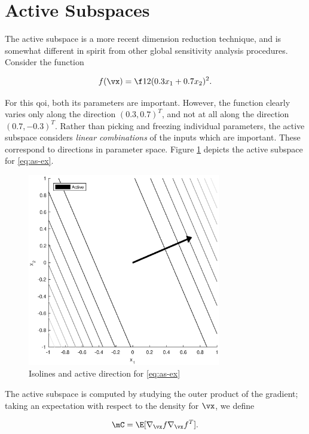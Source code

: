 \documentclass[../primer.tex]{subfiles}
\begin{document}
\section{Active Subspaces}
\label{sec:org7724f8f}
The active subspace is a more recent dimension reduction technique, and is
somewhat different in spirit from other global sensitivity analysis
procedures.\cite{constantine2015} Consider the function

\begin{equation}\label{eq:as-ex}
  f(\vx) = \f12(0.3x_1+0.7x_2)^2.
\end{equation}

\noindent For this qoi, both its parameters are important. However, the function
clearly varies only along the direction \((0.3,0.7)^T\), and not at all along the
direction \((0.7,-0.3)^T\). Rather than picking and freezing individual
parameters, the active subspace considers \emph{linear combinations} of the inputs
which are important. These correspond to directions in parameter space. Figure
\ref{fig:as-ex} depicts the active subspace for \eqref{eq:as-ex}.

\begin{figure}[!ht]
  \centering
  \includegraphics[width=0.75\textwidth]{./images/contour_plot}
  \caption{Isolines and active direction for \eqref{eq:as-ex}}
  \label{fig:as-ex}
\end{figure}

The active subspace is computed by studying the outer product of the gradient;
taking an expectation with respect to the density for \(\vx\), we define

\begin{equation}\label{eq:as-c}
  \mC = \E[\nabla_{\vx}f\nabla_{\vx}f^T].
\end{equation}
\end{document}
